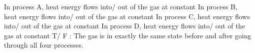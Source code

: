 \documentclass{handout}
\begin{document}
\begin{questions}
    \question In process A, heat energy flows \hspace{.3in}into\hspace{.3in}/\hspace{.3in} out of \hspace{.3in} the gas at constant \blank[1.5in] \answerspace{\baselineskip}
    \question In process B, heat energy flows \hspace{.3in}into\hspace{.3in}/\hspace{.3in} out of \hspace{.3in} the gas at constant \blank[1.5in] \answerspace{\baselineskip}
    \question In process C, heat energy flows \hspace{.3in}into\hspace{.3in}/\hspace{.3in} out of \hspace{.3in} the gas at constant \blank[1.5in] \answerspace{\baselineskip}
    \question In process D, heat energy flows \hspace{.3in}into\hspace{.3in}/\hspace{.3in} out of \hspace{.3in} the gas at constant \blank[1.5in] \answerspace{\baselineskip}
    \question \hspace{.3in}T\hspace{.3in}/\hspace{.3in} F \hspace{.3in}: The gas is in exactly the same state before and after going through all four processes.
\end{questions}
\end{document}
